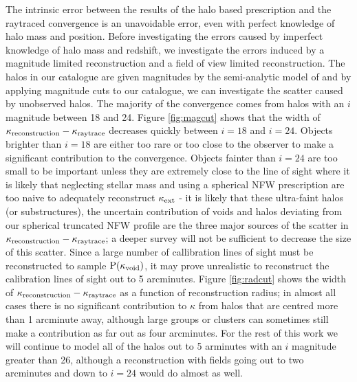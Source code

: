\documentclass[useAMS,usenatbib]{mn2e}
\begin{document}
The intrinsic error between the results of the halo based prescription and the raytraced convergence is an unavoidable error, even with perfect knowledge of halo mass and position. Before investigating the errors caused by imperfect knowledge of halo mass and redshift, we investigate the errors induced by a magnitude limited reconstruction and a field of view limited reconstruction. The halos in our catalogue are given magnitudes by the semi-analytic model of \citet{SAM} and by applying magnitude cuts to our catalogue, we can investigate the scatter caused by unobserved halos. The majority of the convergence comes from halos with an $i$ magnitude between 18 and 24. Figure \ref{fig:magcut} shows that the width of $\kappa_{\rm reconstruction}-\kappa_{\rm raytrace}$ decreases quickly between $i=18$ and $i=24$. Objects brighter than $i=18$ are either too rare or too close to the observer to make a significant contribution to the convergence. Objects fainter than $i=24$ are too small to be important unless they are extremely close to the line of sight where it is likely that neglecting stellar mass and using a spherical NFW prescription are too naive to adequately reconstruct $\kappa_{\rm ext}$ - it is likely that these ultra-faint halos (or substructures), the uncertain contribution of voids and halos deviating from our spherical truncated NFW profile are the three major sources of the scatter in $\kappa_{\rm reconstruction}-\kappa_{\rm raytrace}$; a deeper survey will not be sufficient to decrease the size of this scatter. Since a large number of callibration lines of sight must be reconstructed to sample ${\rm P}(\kappa_{\rm void})$, it may prove unrealistic to reconstruct the calibration lines of sight out to 5 arcminutes. Figure \ref{fig:radcut} shows the width of $\kappa_{\rm reconstruction}-\kappa_{\rm raytrace}$ as a function of reconstruction radius; in almost all cases there is no significant contribution to $\kappa$ from halos that are centred more than 1 arcminute away, although large groups or clusters can sometimes still make a contribution as far out as four arcminutes. For the rest of this work we will continue to model all of the halos out to 5 arminutes with an $i$ magnitude greater than 26, although a reconstruction with fields going out to two arcminutes and down to $i=24$ would do almost as well.
\end{document}
